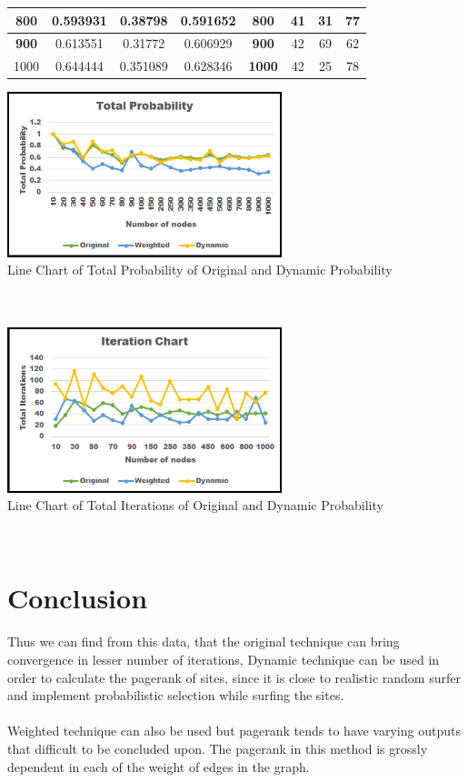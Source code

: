 \documentclass[10pt,a4paper]{article}
\begin{document}
\begin{table}
\begin{tabular}{|c|c|c|c|c|c|c|c|}
\textbf{800}                & 0.593931                 & 0.38798                  & 0.591652                & \textbf{800}  & 41                & 31                & 77               \\ \hline
\textbf{900}                & 0.613551                 & 0.31772                  & 0.606929                & \textbf{900}  & 42                & 69                & 62               \\ \hline
1000                        & 0.644444                 & 0.351089                 & 0.628346                & \textbf{1000} & 42                & 25                & 78               \\ \hline
\end{tabular}
\end{table}
\begin{center}
\includegraphics[width=0.6\textwidth]{Totalprob.png}\\
\caption{Line Chart of Total Probability of Original and Dynamic Probability}\\\\
\includegraphics[width=0.6\textwidth]{iteration.png}\\
\caption{Line Chart of Total Iterations of Original and Dynamic Probability}\\
\end{center}
\section{Conclusion}
Thus we can find from this data, that the original technique can bring convergence in lesser number of iterations, Dynamic technique can be used in order to calculate the pagerank of sites, since it is close to realistic random surfer and implement probabilistic selection while surfing the sites.\\ \\
Weighted technique can also be used but pagerank tends to have varying outputs that difficult to be concluded upon. The pagerank in this method is grossly dependent in each of the weight of edges in the graph.
\end{document}
